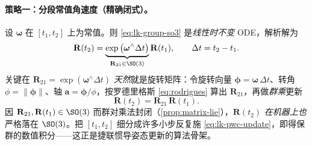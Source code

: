 \paragraph{策略一：分段常值角速度（精确闭式）。}设 $\boldsymbol{\omega}$ 在 $[t_1,t_2]$ 上为常值。则 \cref{eq:lk-group-so3} 是\emph{线性时不变} ODE，解析解为
\begin{equation}
  \mathbf{R}(t_2)=\underbrace{\exp\big(\boldsymbol{\omega}^\wedge\Delta t\big)}_{\mathbf{R}_{21}\in\SO(3)}\mathbf{R}(t_1),\qquad \Delta t=t_2-t_1.
  \label{eq:lk-pwc}
\end{equation}
关键在 $\mathbf{R}_{21}=\exp(\boldsymbol{\omega}^\wedge\Delta t)$ \emph{天然}就是旋转矩阵：令旋转向量 $\boldsymbol{\phi}=\boldsymbol{\omega}\,\Delta t$、转角 $\phi=\|\boldsymbol{\phi}\|$、轴 $\mathbf{a}=\boldsymbol{\phi}/\phi$，按罗德里格斯 \cref{eq:rodrigues} 算出 $\mathbf{R}_{21}$，再做\emph{群乘}更新
\begin{equation}
  \mathbf{R}(t_2)=\mathbf{R}_{21}\,\mathbf{R}(t_1).
  \label{eq:lk-pwc-update}
\end{equation}
因 $\mathbf{R}_{21},\mathbf{R}(t_1)\in\SO(3)$ 而群对乘法封闭（\cref{prop:matrix-lie}），$\mathbf{R}(t_2)$ \emph{在机器上也}严格落在 $\SO(3)$。把 $[t_1,t_2]$ 细分成许多小步反复施 \cref{eq:lk-pwc-update}，即得保群的数值积分——这正是捷联惯导姿态更新的算法骨架。

